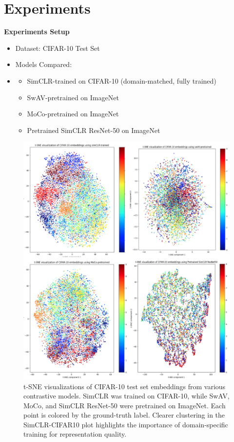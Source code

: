\section{Experiments}
\label{sec:experiments}

\textbf{Experiments Setup}

\begin{itemize}
\item Dataset: CIFAR-10 Test Set
\item Models Compared:
\item \begin{itemize}
\item SimCLR-trained on CIFAR-10 (domain-matched, fully trained)
\item SwAV-pretrained on ImageNet
\item MoCo-pretrained on ImageNet
\item Pretrained SimCLR ResNet-50 on ImageNet
\end{itemize}
\end{itemize}

\begin{figure}[t]
    \centering
    \includegraphics[width=\textwidth]{images/t-SNE-plots.png}
    \caption{t-SNE visualizations of CIFAR-10 test set embeddings from various contrastive models. SimCLR was trained on CIFAR-10, while SwAV, MoCo, and SimCLR ResNet-50 were pretrained on ImageNet. Each point is colored by the ground-truth label. Clearer clustering in the SimCLR-CIFAR10 plot highlights the importance of domain-specific training for representation quality.}
    \label{fig:tsne_plots}
\end{figure}

